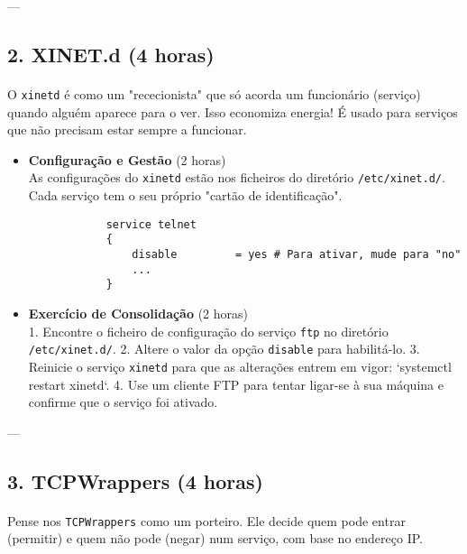 \documentclass[10pt,a4paper]{article}
\begin{document}
	---
	
	\subsection*{2. XINET.d (4 horas)}
	\vspace{-1.2em}
	\paragraph{}
	O \texttt{xinetd} é como um "rececionista" que só acorda um funcionário (serviço) quando alguém aparece para o ver. Isso economiza energia! É usado para serviços que não precisam estar sempre a funcionar.
	
	\begin{itemize}
		\item \textbf{Configuração e Gestão} (2 horas) \\
		As configurações do \texttt{xinetd} estão nos ficheiros do diretório \texttt{/etc/xinet.d/}. Cada serviço tem o seu próprio "cartão de identificação".
		\begin{verbatim}
			service telnet
			{
				disable         = yes # Para ativar, mude para "no"
				...
			}
		\end{verbatim}
		
		\item \textbf{Exercício de Consolidação} (2 horas) \\
		1. Encontre o ficheiro de configuração do serviço \texttt{ftp} no diretório \texttt{/etc/xinet.d/}.
		2. Altere o valor da opção \texttt{disable} para habilitá-lo.
		3. Reinicie o serviço \texttt{xinetd} para que as alterações entrem em vigor: `systemctl restart xinetd`.
		4. Use um cliente FTP para tentar ligar-se à sua máquina e confirme que o serviço foi ativado.
	\end{itemize}
	
	---
	
	\subsection*{3. TCPWrappers (4 horas)}
	\vspace{-1.2em}
	\paragraph{}
	Pense nos \texttt{TCPWrappers} como um porteiro. Ele decide quem pode entrar (permitir) e quem não pode (negar) num serviço, com base no endereço IP.
	
\end{document}
